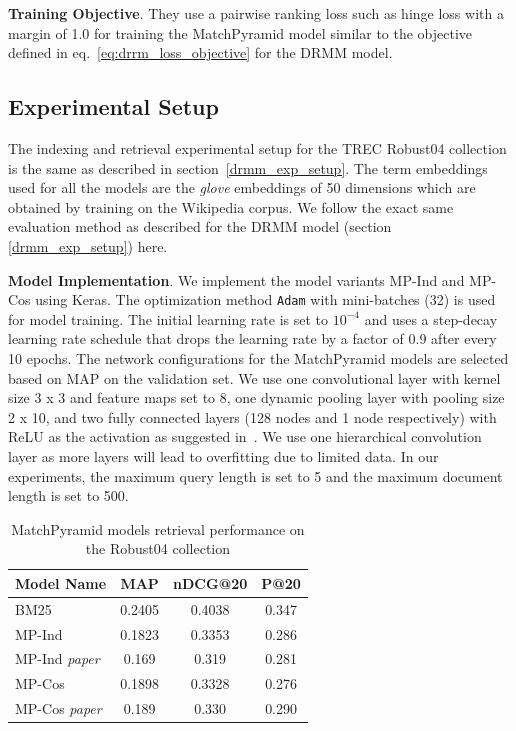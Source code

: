 \textbf{Training Objective}. They use a pairwise ranking loss such as hinge loss with a margin of 1.0 for training the MatchPyramid model similar to the objective defined in eq.~\ref{eq:drrm_loss_objective} for the DRMM model.

\subsection{Experimental Setup}
The indexing and retrieval experimental setup for the TREC Robust04 collection is the same as described in section~\ref{drmm_exp_setup}. The term embeddings used for all the models are the \textit{glove} embeddings of 50 dimensions which are obtained by training on the Wikipedia corpus. We follow the exact same evaluation method as described for the DRMM model (section \ref{drmm_exp_setup}) here.

\textbf{Model Implementation}. We implement the model variants MP-Ind and MP-Cos using Keras. The optimization method \texttt{Adam} with mini-batches (32) is used for model training. The initial learning rate is set to $10^{-4}$ and uses a step-decay learning rate schedule that drops the learning rate by a factor of 0.9 after every 10 epochs. The network configurations for the MatchPyramid models are selected based on MAP on the validation set. We use one convolutional layer with kernel size 3 x 3 and feature maps set to 8, one dynamic pooling layer with pooling size 2 x 10, and two fully connected layers (128 nodes and 1 node respectively) with ReLU as the activation as suggested in~\citep{matchpyramid16}. We use one hierarchical convolution layer as more layers will lead to overfitting due to limited data. In our experiments, the maximum query length is set to 5 and the maximum document length is set to 500.

\begin{table}[]
    \centering
    \begin{tabular}{lccc}
    \toprule
        Model Name & MAP & nDCG@20 & P@20 \\
        \midrule
        BM25 & 0.2405 & 0.4038 & 0.347 \\
        MP-Ind & 0.1823 & 0.3353 & 0.286 \\
        MP-Ind \textit{paper} & 0.169 & 0.319 & 0.281 \\
        MP-Cos & 0.1898 & 0.3328 & 0.276\\
        MP-Cos \textit{paper} & 0.189 & 0.330 & 0.290\\
    \bottomrule
    \end{tabular}
    \caption{MatchPyramid models retrieval performance on the Robust04 collection}
    \label{tab:mp_eval}
\end{table}

